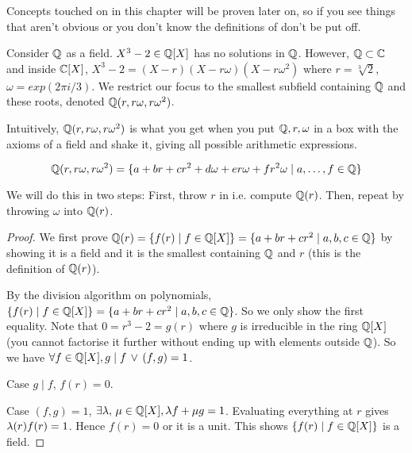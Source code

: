 \documentclass[../book.tex]{subfiles}
\begin{document}

Concepts touched on in this chapter will be proven later on,
so if you see things that aren't obvious or 
you don't know the definitions of don't be put off.

\begin{eg} 

Consider $\mathbb{Q}$ as a field.
$X^3 - 2 \in \mathbb{Q}[X]$ has no solutions in $\mathbb{Q}$.
However, $\mathbb{Q} \subset \mathbb{C}$ and inside $\mathbb{C}[X]$, 
$X^3 - 2 = (X - r)(X - r\omega)(X - r\omega^2)$ where 
$r = \sqrt[3]{2}$, $\omega = exp(2\pi i / 3)$. 
We restrict our focus to the smallest subfield containing $\mathbb{Q}$ 
and these roots, denoted $\mathbb{Q}(r, r\omega, r\omega^2)$. 

Intuitively, $\mathbb{Q}(r, r\omega, r\omega^2)$ is what you get when you put
$\mathbb{Q}, r, \omega$ in a box with the axioms of a field and shake it, 
giving all possible arithmetic expressions. 

\begin{clm} 
    \[ 
        \mathbb{Q}(r, r\omega, r\omega^2) 
        = \{a + b r + c r^2 + d\omega + er\omega + fr^2\omega
        \mid a, \dots, f \in \mathbb{Q}\} 
    \]
\end{clm}

We will do this in two steps: 
First, throw $r$ in i.e. compute $\mathbb{Q}(r)$. 
Then, repeat by throwing $\omega$ into $\mathbb{Q}(r)$.

\begin{proof} 
    We first prove 
    $\mathbb{Q}(r) = \{f(r) \mid f \in \mathbb{Q}[X] \} =\{a + br + cr^2 \mid a, b, c \in \mathbb{Q} \}$ 
    by showing it is a field and it is the smallest containing $\mathbb{Q}$ and $r$
    (this is the definition of $\mathbb{Q}(r)$). 
    
    By the division algorithm on polynomials, 
    $\{f(r) \mid f \in \mathbb{Q}[X] \} =\{a + br + cr^2 \mid a, b, c \in \mathbb{Q} \}$.
    So we only show the first equality.
    Note that $ 0 = r^3 - 2 = g(r)$ where $g$ is irreducible in the ring $\mathbb{Q}[X]$ 
    (you cannot factorise it further without ending up with elements outside $\mathbb{Q}$).
    So we have  $\forall f \in \mathbb{Q}[X], g \mid f \,\lor\, (f, g) = 1$.

    Case $g \mid f$, $f(r) = 0$. 

    Case $(f, g) = 1$, $\exists \lambda,\,\mu\in\mathbb{Q}[X], \lambda f + \mu g = 1$. 
    Evaluating everything at $r$ gives $\lambda(r)f(r) = 1$. 
    Hence $f(r)=0$ or it is a unit. 
    This shows $\{f(r) \mid f \in \mathbb{Q}[X] \}$ is a field. 
    

\end{proof}
\end{eg}
\end{document}

